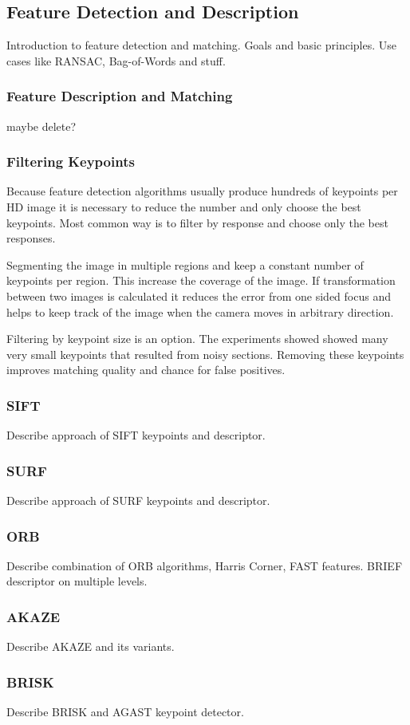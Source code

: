 \subsection{Feature Detection and Description}
\label{sec:feature_algorithms}

Introduction to feature detection and matching.
Goals and basic principles.
Use cases like RANSAC, Bag-of-Words and stuff.

\subsubsection{Feature Description and Matching}

maybe delete?

\subsubsection{Filtering Keypoints}

Because feature detection algorithms usually produce hundreds of keypoints per HD image it is necessary to reduce the number and only choose the best keypoints.
Most common way is to filter by response and choose only the best responses.

Segmenting the image in multiple regions and keep a constant number of keypoints per region.
This increase the coverage of the image.
If transformation between two images is calculated it reduces the error from one sided focus and helps to keep track of the image when the camera moves in arbitrary direction.

Filtering by keypoint size is an option. The experiments showed showed many very small keypoints that resulted from noisy sections.
Removing these keypoints improves matching quality and chance for false positives.

\subsubsection{SIFT}

Describe approach of SIFT keypoints and descriptor.

\subsubsection{SURF}

Describe approach of SURF keypoints and descriptor.

\subsubsection{ORB}

Describe combination of ORB algorithms, Harris Corner, FAST features.
BRIEF descriptor on multiple levels.

\subsubsection{AKAZE}

Describe AKAZE and its variants.

\subsubsection{BRISK}

Describe BRISK and AGAST keypoint detector.

